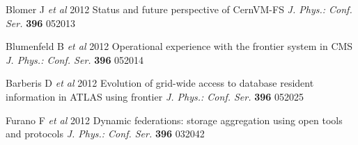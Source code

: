 \documentclass[a4paper]{jpconf}
\begin{document}
\begin{thebibliography}{10}
 Blomer J {\it et al} 2012 Status and future perspective of CernVM-FS \textit{J. Phys.: Conf. Ser.} \textbf{396} 052013

 Blumenfeld B {\it et al} 2012 Operational experience with the frontier system in CMS \textit{J. Phys.: Conf. Ser.} \textbf{396} 052014

 Barberis D {\it et al} 2012 Evolution of grid-wide access to database resident information in ATLAS using frontier \textit{J. Phys.: Conf. Ser.} \textbf{396} 052025 

 Furano F  {\it et al} 2012  Dynamic federations:  storage aggregation using open tools and protocols \textit{J. Phys.: Conf. Ser.} \textbf{396} 032042

\end{thebibliography}
\end{document}
